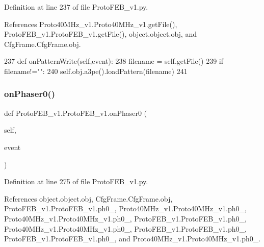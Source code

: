 Definition at line 237 of file Proto\+F\+E\+B\+\_\+v1.\+py.



References Proto40\+M\+Hz\+\_\+v1.\+Proto40\+M\+Hz\+\_\+v1.\+get\+File(), Proto\+F\+E\+B\+\_\+v1.\+Proto\+F\+E\+B\+\_\+v1.\+get\+File(), object.\+object.\+obj, and Cfg\+Frame.\+Cfg\+Frame.\+obj.


\begin{DoxyCode}
237     \textcolor{keyword}{def }onPatternWrite(self,event):
238         filename = self.getFile()
239         \textcolor{keywordflow}{if} filename!=\textcolor{stringliteral}{""}:
240             self.obj.a3pe().loadPattern(filename)
241 
\end{DoxyCode}
\mbox{\label{classProtoFEB__v1_1_1ProtoFEB__v1_a06d63189000c361c5ebaf7258bce3af2}} 
\subsubsection{\texorpdfstring{on\+Phaser0()}{onPhaser0()}}
{\footnotesize\ttfamily def Proto\+F\+E\+B\+\_\+v1.\+Proto\+F\+E\+B\+\_\+v1.\+on\+Phaser0 (\begin{DoxyParamCaption}\item[{}]{self,  }\item[{}]{event }\end{DoxyParamCaption})}



Definition at line 275 of file Proto\+F\+E\+B\+\_\+v1.\+py.



References object.\+object.\+obj, Cfg\+Frame.\+Cfg\+Frame.\+obj, Proto\+F\+E\+B\+\_\+v1.\+Proto\+F\+E\+B\+\_\+v1.\+ph0\+\_, Proto40\+M\+Hz\+\_\+v1.\+Proto40\+M\+Hz\+\_\+v1.\+ph0\+\_, Proto40\+M\+Hz\+\_\+v1.\+Proto40\+M\+Hz\+\_\+v1.\+ph0\+\_, Proto\+F\+E\+B\+\_\+v1.\+Proto\+F\+E\+B\+\_\+v1.\+ph0\+\_, Proto40\+M\+Hz\+\_\+v1.\+Proto40\+M\+Hz\+\_\+v1.\+ph0\+\_, Proto\+F\+E\+B\+\_\+v1.\+Proto\+F\+E\+B\+\_\+v1.\+ph0\+\_, Proto\+F\+E\+B\+\_\+v1.\+Proto\+F\+E\+B\+\_\+v1.\+ph0\+\_, and Proto40\+M\+Hz\+\_\+v1.\+Proto40\+M\+Hz\+\_\+v1.\+ph0\+\_.



